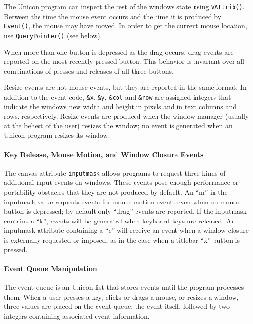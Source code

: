 The Unicon program can inspect the rest of the window{\textquotesingle}s
state using \texttt{WAttrib()}. Between the time the mouse event
occurs and the time it is produced by \texttt{Event()}, the mouse may
have moved. In order to get the current mouse location, use
\texttt{QueryPointer()} (see below).

When more than one button is depressed as the drag occurs, drag events
are reported on the most recently pressed button. This behavior is
invariant over all combinations of presses and releases of all three
buttons.

Resize events are not mouse events, but they are reported in the same
format. In addition to the event code, \texttt{\&x}, \texttt{\&y}, \texttt{\&col} and
\texttt{\&row} are assigned integers that indicate the window{\textquotesingle}s
new width and height in pixels and in text columns and rows,
respectively. Resize events are produced when the window manager
(usually at the behest of the user) resizes the window; no event is
generated when an Unicon program resizes its window.

\paragraph{Key Release, Mouse Motion, and Window Closure Events}
The canvas attribute \texttt{inputmask} allows programs to request three kinds
of additional input events on windows. These events pose enough
performance or portability obstacles that they are not produced by
default. An {\textquotedblleft}m{\textquotedblright} in the inputmask
value requests events for mouse motion events even when no mouse button
is depressed; by default only
{\textquotedblleft}drag{\textquotedblright} events are reported. If the
inputmask contains a {\textquotedblleft}k{\textquotedblright}, events
will be generated when keyboard keys are released. An inputmask
attribute containing a {\textquotedblleft}c{\textquotedblright} will
receive an event when a window closure is externally requested or
imposed, as in the case when a titlebar
{\textquotedblleft}x{\textquotedblright} button is pressed.

\paragraph{Event Queue Manipulation}
The event queue is an Unicon list that stores events until the program
processes them. When a user presses a key, clicks or drags a mouse,
or resizes a window, three values are placed on the event queue: the
event itself, followed by two integers containing associated event
information.

